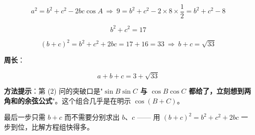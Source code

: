 \begin{answer}
\nopagebreak[4]
\[a^{2}=b^{2}+c^{2}-2bc\cos A\ \Longrightarrow\ 9=b^{2}+c^{2}-2\times8\times\frac12=b^{2}+c^{2}-8\]

\nopagebreak[4]
\[b^{2}+c^{2}=17\]

\nopagebreak[4]
\[(b+c)^{2}=b^{2}+c^{2}+2bc=17+16=33\ \Longrightarrow\ b+c=\sqrt{33}\]

\textbf{周长}：

\nopagebreak[4]
\[a+b+c=3+\sqrt{33}\]

\begin{gktip}
\textbf{方法提示}：第 (2) 问的突破口是"\textbf{$\sin B\sin C$ 与 $\cos B\cos C$ 都给了，立刻想到两角和的余弦公式}"。这个组合几乎是在明示 $\cos(B+C)$。

最后一步只需 $b+c$ 而不需要分别求出 $b$、$c$ —— 用 $(b+c)^{2}=b^{2}+c^{2}+2bc$ 一步到位，比解方程组快得多。
\end{gktip}



\par\medskip

\end{answer}
